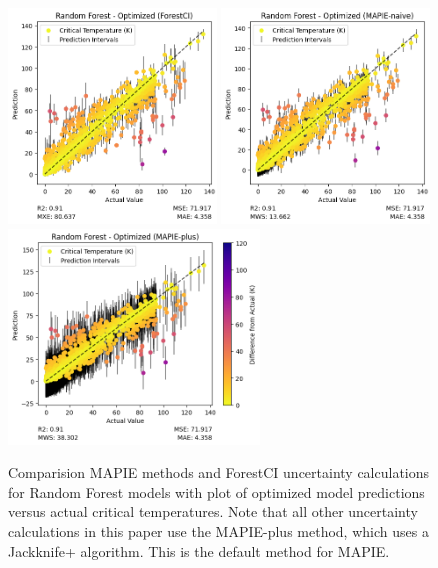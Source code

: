 \documentclass[twocolumn, nofootinbib, secnumarabic, amssymb, nobibnotes, aps, prd]{revtex4-2}
\begin{document}
\begin{figure}[!h]
   \centering
   \includegraphics[height=2.25in]{images/subfigures/random_forest_optimized_forestci.png} \nolinebreak
   \includegraphics[height=2.25in]{images/subfigures/random_forest_optimized_mapie-naive.png} \nolinebreak
   \includegraphics[height=2.25in]{images/subfigures/random_forest_optimized_mapie-plus.png}
   \caption{Comparision MAPIE methods and ForestCI uncertainty calculations for Random Forest models with plot of optimized model predictions versus actual critical temperatures. Note that all other uncertainty calculations in this paper use the MAPIE-plus method, which uses a Jackknife+ algorithm. This is the default method for MAPIE.}
   \label{fig:mapie-forestci}
\end{figure}%
\end{document}
